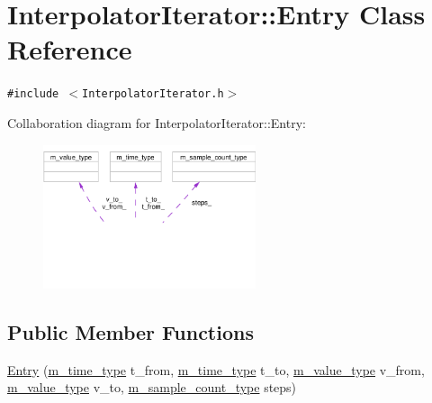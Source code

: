 \hypertarget{classInterpolatorIterator_1_1Entry}{
\section{Interpolator\-Iterator::Entry Class Reference}
\label{classInterpolatorIterator_1_1Entry}
}
{\tt \#include $<$Interpolator\-Iterator.h$>$}

Collaboration diagram for Interpolator\-Iterator::Entry:\begin{figure}[H]
\begin{center}
\leavevmode
\includegraphics[width=177pt]{classInterpolatorIterator_1_1Entry__coll__graph}
\end{center}
\end{figure}
\subsection*{Public Member Functions}
\begin{CompactItemize}
\item 
\hyperlink{classInterpolatorIterator_1_1Entry_a0}{Entry} (\hyperlink{Types_8h_a2}{m\_\-time\_\-type} t\_\-from, \hyperlink{Types_8h_a2}{m\_\-time\_\-type} t\_\-to, \hyperlink{Types_8h_a3}{m\_\-value\_\-type} v\_\-from, \hyperlink{Types_8h_a3}{m\_\-value\_\-type} v\_\-to, \hyperlink{Types_8h_a1}{m\_\-sample\_\-count\_\-type} steps)
\end{CompactItemize}
